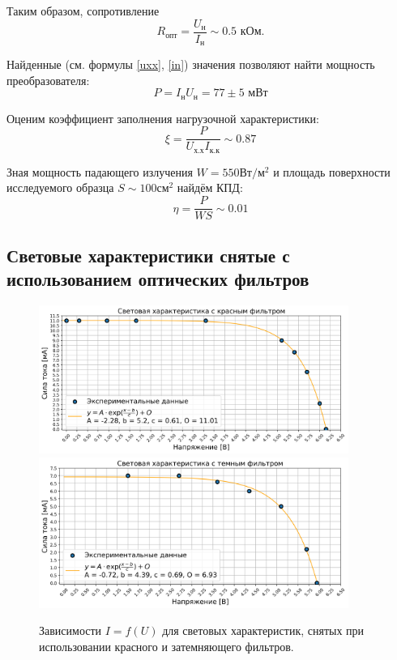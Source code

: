 \documentclass[a4paper, 12pt]{extarticle}
\begin{document}
Таким образом, сопротивление 
\begin{equation}
R_{\text{опт}} = \frac{U_{\text{н}}}{I_{\text{н}}} \sim 0.5 \text{ кОм}. 
\end{equation}


Найденные (см. формулы \ref{uxx}, \ref{in}) значения позволяют найти мощность преобразователя:
\begin{equation}
    P  = I_{\text{н}} U_{\text{н}} = 77 \pm 5 \text{ мВт}
\end{equation}

Оценим коэффициент заполнения нагрузочной характеристики:
\begin{equation}
    \xi = \frac{P}{U_{\text{х.х}} I_{\text{к.к}}} \sim 0.87
\end{equation}


Зная мощность падающего излучения $W = 550 \text{Вт}/\text{м}^{2}$ и площадь поверхности исследуемого образца $S \sim 100 \text{см}^2$ найдём КПД:
\begin{equation}
    \eta = \frac{P}{W S} \sim 0.01  
    \label{kpd}
\end{equation}



\subsection*{\textcolor{sub_header}{Световые характеристики снятые с использованием оптических фильтров}}
\begin{figure}[htbp]
    \centering
    \includegraphics[width = 0.9\textwidth]{pics/red_filter.png} \hfill
    \includegraphics[width = 0.9\textwidth]{pics/black_filter.png}
    \caption{Зависимости $I = f(U)$ для световых характеристик, снятых при использовании красного и затемняющего фильтров.}
    \label{fig:filters}
\end{figure}
\end{document}
